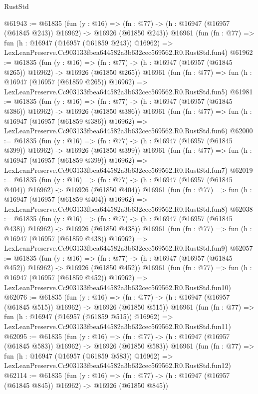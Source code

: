 \begin{lexlean}{RustStd}
\begin{coremodule}
@61943 := @61835
    (fun (y : @16) =>
    (fn : @77) -> (h : @16947 (@16957 (@61845 @243)) @16962) -> @16926 (@61850 @243))
    @16961
    (fun (fn : @77) =>
    fun (h : @16947 (@16957 (@61859 @243)) @16962) =>
    LexLeanPreserve.Cc903133fbea644582a3b632cec569562.R0.RustStd.fun4)
@61962 := @61835
    (fun (y : @16) =>
    (fn : @77) -> (h : @16947 (@16957 (@61845 @265)) @16962) -> @16926 (@61850 @265))
    @16961
    (fun (fn : @77) =>
    fun (h : @16947 (@16957 (@61859 @265)) @16962) =>
    LexLeanPreserve.Cc903133fbea644582a3b632cec569562.R0.RustStd.fun5)
@61981 := @61835
    (fun (y : @16) =>
    (fn : @77) -> (h : @16947 (@16957 (@61845 @386)) @16962) -> @16926 (@61850 @386))
    @16961
    (fun (fn : @77) =>
    fun (h : @16947 (@16957 (@61859 @386)) @16962) =>
    LexLeanPreserve.Cc903133fbea644582a3b632cec569562.R0.RustStd.fun6)
@62000 := @61835
    (fun (y : @16) =>
    (fn : @77) -> (h : @16947 (@16957 (@61845 @399)) @16962) -> @16926 (@61850 @399))
    @16961
    (fun (fn : @77) =>
    fun (h : @16947 (@16957 (@61859 @399)) @16962) =>
    LexLeanPreserve.Cc903133fbea644582a3b632cec569562.R0.RustStd.fun7)
@62019 := @61835
    (fun (y : @16) =>
    (fn : @77) -> (h : @16947 (@16957 (@61845 @404)) @16962) -> @16926 (@61850 @404))
    @16961
    (fun (fn : @77) =>
    fun (h : @16947 (@16957 (@61859 @404)) @16962) =>
    LexLeanPreserve.Cc903133fbea644582a3b632cec569562.R0.RustStd.fun8)
@62038 := @61835
    (fun (y : @16) =>
    (fn : @77) -> (h : @16947 (@16957 (@61845 @438)) @16962) -> @16926 (@61850 @438))
    @16961
    (fun (fn : @77) =>
    fun (h : @16947 (@16957 (@61859 @438)) @16962) =>
    LexLeanPreserve.Cc903133fbea644582a3b632cec569562.R0.RustStd.fun9)
@62057 := @61835
    (fun (y : @16) =>
    (fn : @77) -> (h : @16947 (@16957 (@61845 @452)) @16962) -> @16926 (@61850 @452))
    @16961
    (fun (fn : @77) =>
    fun (h : @16947 (@16957 (@61859 @452)) @16962) =>
    LexLeanPreserve.Cc903133fbea644582a3b632cec569562.R0.RustStd.fun10)
@62076 := @61835
    (fun (y : @16) =>
    (fn : @77) -> (h : @16947 (@16957 (@61845 @515)) @16962) -> @16926 (@61850 @515))
    @16961
    (fun (fn : @77) =>
    fun (h : @16947 (@16957 (@61859 @515)) @16962) =>
    LexLeanPreserve.Cc903133fbea644582a3b632cec569562.R0.RustStd.fun11)
@62095 := @61835
    (fun (y : @16) =>
    (fn : @77) -> (h : @16947 (@16957 (@61845 @583)) @16962) -> @16926 (@61850 @583))
    @16961
    (fun (fn : @77) =>
    fun (h : @16947 (@16957 (@61859 @583)) @16962) =>
    LexLeanPreserve.Cc903133fbea644582a3b632cec569562.R0.RustStd.fun12)
@62114 := @61835
    (fun (y : @16) =>
    (fn : @77) -> (h : @16947 (@16957 (@61845 @845)) @16962) -> @16926 (@61850 @845))

\end{coremodule}
\end{lexlean}
